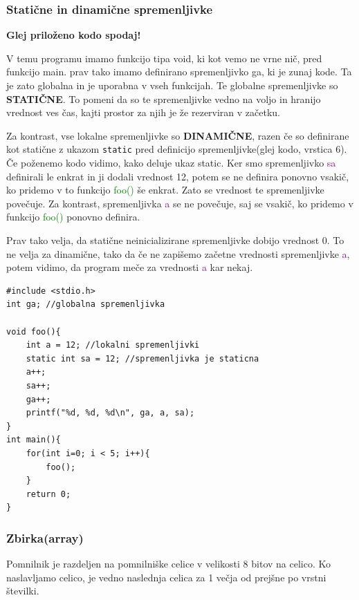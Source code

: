 \documentclass[a4paper, 12pt]{article}
\begin{document}
\subsubsection{Statične in dinamične spremenljivke}
\textbf{Glej priloženo kodo spodaj!}

V temu programu imamo funkcijo tipa void, ki kot vemo ne vrne nič, pred funkcijo main. prav tako imamo definirano spremenljivko ga, ki je zunaj kode. Ta je zato globalna in je uporabna v vseh funkcijah. Te globalne spremenljivke so \textbf{STATIČNE}. To pomeni da so te spremenljivke vedno na voljo in hranijo vrednost ves čas, kajti prostor za njih je že rezerviran v začetku.

Za kontrast, vse lokalne spremenljivke so \textbf{DINAMIČNE}, razen če so definirane kot statične z ukazom \lstinline|static| pred definicijo spremenljivke(glej kodo, vrstica 6). Če poženemo kodo vidimo, kako deluje ukaz static. Ker smo spremenljivko \textcolor{purple}{sa} definirali le enkrat in ji dodali vrednost 12, potem se ne definira ponovno vsakič, ko pridemo v to funkcijo \textcolor{green}{foo()} še enkrat. Zato se vrednost te spremenljivke povečuje. Za kontrast, spremenljivka \textcolor{purple}{a} se ne povečuje, saj se vsakič, ko pridemo v funkcijo \textcolor{green}{foo()} ponovno definira.

Prav tako velja, da statične neinicializirane spremenljivke dobijo vrednost 0. To ne velja za dinamične, tako da če ne zapišemo začetne vrednosti spremenljivke \textcolor{purple}{a}, potem vidimo, da program meče za vrednosti \textcolor{purple}{a} kar nekaj.

\pagebreak

\begin{lstlisting}[caption = Statične in dinamične spremenljivke]
#include <stdio.h>
int ga; //globalna spremenljivka

void foo(){
	int a = 12;	//lokalni spremenljivki
	static int sa = 12; //spremenljivka je staticna
	a++;
	sa++;
	ga++;
	printf("%d, %d, %d\n", ga, a, sa);
}
int main(){
	for(int i=0; i < 5; i++){
		foo();
	}
	return 0;
}	
\end{lstlisting}
\subsubsection{Zbirka(array)}
Pomnilnik je razdeljen na pomnilniške celice v velikosti 8 bitov na celico. Ko naslavljamo celico, je vedno naslednja celica za 1 večja od prejšne po vrstni številki. \

\begin{center}
\end{center}
\end{document}
